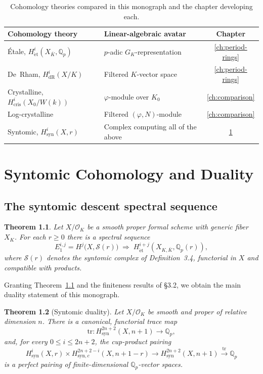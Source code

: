 \documentclass[10pt]{amsbook}
\newtheorem{theorem}{Theorem}[chapter]
\theoremstyle{definition}
\theoremstyle{remark}
\newcommand{\Qp}{\mathbb{Q}_p}
\begin{document}
\begin{table}[htb]
\centering
\caption{Cohomology theories compared in this monograph and the chapter developing each.}
\label{tab:theories}
\begin{tabular}{@{}llc@{}}
\toprule
Cohomology theory & Linear-algebraic avatar & Chapter \\
\midrule
Étale, $H^i_{\mathrm{\acute et}}(X_{\overline K}, \Qp)$ & $p$-adic $G_K$-representation & \ref{ch:period-rings} \\
De~Rham, $H^i_{\mathrm{dR}}(X/K)$ & Filtered $K$-vector space & \ref{ch:period-rings} \\
Crystalline, $H^i_{\mathrm{cris}}(X_0/W(k))$ & $\varphi$-module over $K_0$ & \ref{ch:comparison} \\
Log-crystalline & Filtered $(\varphi,N)$-module & \ref{ch:comparison} \\
Syntomic, $H^i_{\mathrm{syn}}(X, r)$ & Complex computing all of the above & \ref{ch:syntomic} \\
\bottomrule
\end{tabular}
\end{table}

\chapter{Syntomic Cohomology and Duality}
\label{ch:syntomic}

\section{The syntomic descent spectral sequence}

\begin{theorem}\label{thm:syntomic-descent}
Let $X/\mathcal{O}_K$ be a smooth proper formal scheme with generic fiber $X_K$. For each
$r \geq 0$ there is a spectral sequence
\[
  E_1^{i,j} = H^j\bigl(X, \mathcal{S}(r)\bigr) \; \Longrightarrow \;
  H^{i+j}_{\mathrm{\acute et}}(X_{K, \overline K}, \Qp(r)),
\]
where $\mathcal{S}(r)$ denotes the syntomic complex of Definition~3.4, functorial in $X$ and
compatible with products.
\end{theorem}

Granting Theorem~\ref{thm:syntomic-descent} and the finiteness results of \S 3.2, we obtain
the main duality statement of this monograph.

\begin{theorem}[Syntomic duality]\label{thm:duality}
Let $X/\mathcal{O}_K$ be smooth and proper of relative dimension $n$. There is a canonical,
functorial trace map
\[
  \mathrm{tr} \colon H^{2n+2}_{\mathrm{syn}}(X, n+1) \longrightarrow \Qp,
\]
and, for every $0 \le i \le 2n+2$, the cup-product pairing
\[
  H^i_{\mathrm{syn}}(X, r) \times H^{2n+2-i}_{\mathrm{syn},c}(X, n+1-r) \longrightarrow
  H^{2n+2}_{\mathrm{syn}}(X, n+1) \xrightarrow{\ \mathrm{tr}\ } \Qp
\]
is a perfect pairing of finite-dimensional $\Qp$-vector spaces.
\end{theorem}
\end{document}
